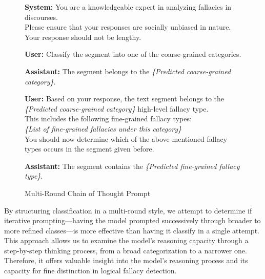 \begin{figure}[H]
    \centering
    \begin{tcolorbox}[colback=white, colframe=black, title={Multi-Round Chain of Thought Experiment}, sharp corners=south]
        
        \begin{tcolorbox}[colback=gray!10, colframe=black, sharp corners=south]
        \textbf{System:} You are a knowledgeable expert in analyzing fallacies in discourses. \\
        Please ensure that your responses are socially unbiased in nature. Your response should not be lengthy.
        \end{tcolorbox}

        \begin{tcolorbox}[colback=blue!5, colframe=black, sharp corners=south]
        \textbf{User:} Classify the segment into one of the coarse-grained categories.
        \end{tcolorbox}

        \begin{tcolorbox}[colback=green!5, colframe=black, sharp corners=south]
        \textbf{Assistant:} The segment belongs to the \textit{\{Predicted coarse-grained category\}}.
        \end{tcolorbox}

        \begin{tcolorbox}[colback=blue!5, colframe=black, sharp corners=south]
        \textbf{User:} Based on your response, the text segment belongs to the \textit{\{Predicted coarse-grained category\}} high-level fallacy type.\\
        This includes the following fine-grained fallacy types: \\
        \textit{\{List of fine-grained fallacies under this category\}} \\
        You should now determine which of the above-mentioned fallacy types occurs in the segment given before.
        \end{tcolorbox}

        \begin{tcolorbox}[colback=green!5, colframe=black, sharp corners=south]
        \textbf{Assistant:} The segment contains the \textit{\{Predicted fine-grained fallacy type\}}.
        \end{tcolorbox}
    \end{tcolorbox}
    \caption{Multi-Round Chain of Thought Prompt}
\end{figure}

By structuring classification in a multi-round style, we attempt to determine if iterative prompting—having the model prompted successively through broader to more refined classes—is more effective than having it classify in a single attempt. This approach allows us to examine the model's reasoning capacity through a step-by-step thinking process, from a broad categorization to a narrower one. Therefore, it offers valuable insight into the model's reasoning process and its capacity for fine distinction in logical fallacy detection.


